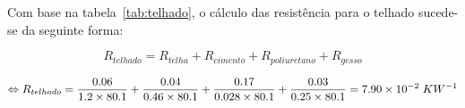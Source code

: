 \documentclass[12pt, a4paper]{article}
\begin{document}
Com base na tabela~\ref*{tab:telhado}, o cálculo das resistência para o telhado sucede-se da seguinte forma:

\begin{equation}
	R_{telhado} = R_{telha} + R_{cimento} + R_{poliuretano} + R_{gesso}
	\label{eq:telhado1}
\end{equation}

\begin{equation}
	\Leftrightarrow R_{telhado} =
	\dfrac{0.06}{1.2 \times 80.1} +
	\dfrac{0.04}{0.46 \times 80.1} +
	\dfrac{0.17}{0.028 \times 80.1} +
	\dfrac{0.03}{0.25 \times 80.1} = 7.90 \times 10^{-2} \hspace{1mm} KW^{-1}
	\label{eq:telhado2}
\end{equation}



\pagebreak
\printbibliography{}
\end{document}
